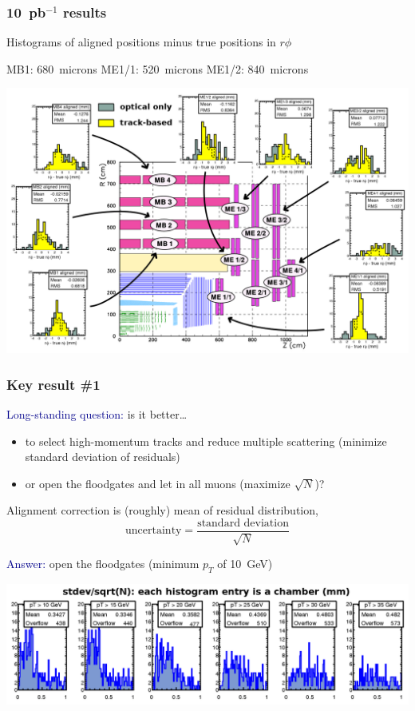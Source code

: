 \documentclass[compress]{beamer}
\begin{document}
\begin{frame}
\frametitle{10~pb$^{-1}$ results}
\small
Histograms of aligned positions minus true positions in $r\phi$

MB1: 680~microns \hspace{0.3 cm} ME1/1: 520~microns \hspace{0.3 cm} ME1/2: 840~microns

\includegraphics[width=\linewidth]{all_results_crop.png}
\end{frame}

\begin{frame}
\frametitle{Key result \#1}
\small

\textcolor{darkblue}{Long-standing question:} is it better\ldots
\begin{itemize}
\item to select high-momentum tracks and reduce multiple scattering (minimize standard deviation of residuals)
\item or open the floodgates and let in all muons (maximize $\sqrt{N}$)?
\end{itemize}

\vfill
Alignment correction is (roughly) mean of residual distribution,
\[ \mbox{uncertainty} = \frac{\mbox{standard deviation}}{\sqrt{N}} \]

\vfill
\textcolor{darkblue}{Answer:} open the floodgates (minimum $p_T$ of 10~GeV)

\vspace{0.1 cm}
\includegraphics[width=\linewidth]{widening.png}
\end{frame}
\end{document}
